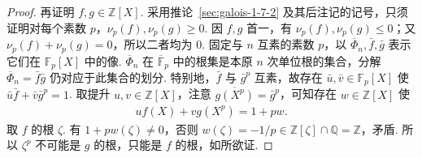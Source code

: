 \begin{itemize}
\begin{proof}
再证明 $f,g\in\mathbb Z[X]$. 采用推论~\ref{sec:galois-1-7-2} 及其后注记的记号，只须证明对每个素数 $p$，$\nu_p(f),\nu_p(g)\geq0$. 因 $f,g$ 首一，有 $\nu_p(f),\nu_p(g)\leq0$；又 $\nu_p(f)+\nu_p(g)=0$，所以二者均为 $0$.
固定与 $n$ 互素的素数 $p$，以 $\overline\Phi_n,\bar f,\bar g$ 表示它们在 $\mathbb F_p[X]$ 中的像. $\overline\Phi_n$ 在 $\overline{\mathbb F}_p$ 中的根集是本原 $n$ 次单位根的集合，分解 $\overline\Phi_n=\bar f\bar g$ 仍对应于此集合的划分. 特别地，$\bar f$ 与 $\bar g^p$ 互素，故存在 $\bar u,\bar v\in\mathbb F_p[X]$ 使 $\bar u\bar f+\bar v\bar g^p=1$. 取提升 $u,v\in\mathbb Z[X]$，注意 $\overline{g(X^p)}=\bar g^p$，可知存在 $w\in\mathbb Z[X]$ 使
\begin{align*}uf(X)+vg(X^p)=1+pw.\end{align*}
取 $f$ 的根 $\zeta$. 有 $1+pw(\zeta)\ne0$，否则 $w(\zeta)=-1/p\in\mathbb Z[\zeta]\cap\mathbb Q=\mathbb Z$，矛盾. 所以 $\zeta^p$ 不可能是 $g$ 的根，只能是 $f$ 的根，如所欲证.\end{proof}
\end{itemize}
